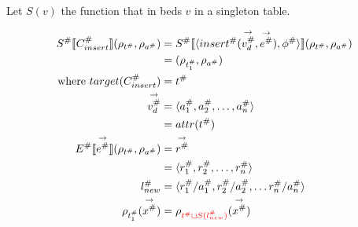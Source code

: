 Let $S(v)$ the function that in beds $v$ in a singleton table.



\begin{align*}
    S^\# \llbracket C_{insert}^\# \rrbracket (\rho_{t^\#}, \rho_{a^\#})
                                               & = S^\# \llbracket \langle insert^\#(\overset{\rightarrow}{v_d^\#}, \overset{\rightarrow}{e^\#}), \phi^\# \rangle \rrbracket (\rho_{t^\#}, \rho_{a^\#}) \\
                                               & = (\rho_{t_1^\#}, \rho_{a^\#})                                                                                                                         \\
    \text{where } target(C_{insert}^\#)        & = t^\#                                                                                                                                                 \\
    \overset{\rightarrow}{v_d^\#}              & = \langle a_1^\#, a_2^\#, \dots, a_n^\# \rangle                                                                                                        \\
                                               & = attr(t^\#)                                                                                                                                           \\
    E^\# \llbracket \overset{\rightarrow}{e^\#} \rrbracket (\rho_{t^\#}, \rho_{a^\#})
                                               & = \overset{\rightarrow}{r^\#}                                                                                                                          \\
                                               & = \langle r_1^\#, r_2^\#, \dots, r_n^\# \rangle                                                                                                        \\
    l_{new}^\#                                 & = \langle r_1^\#/a_1^\#, r_2^\#/a_2^\#, \dots r_n^\#/a_n^\# \rangle                                                                                    \\
    \rho_{t_1^\#}(\overset{\rightarrow}{x^\#}) & = \rho_{\textcolor{red}{t^\# \sqcup S(l_{new}^\#)}}(\overset{\rightarrow}{x^\#})
\end{align*}

